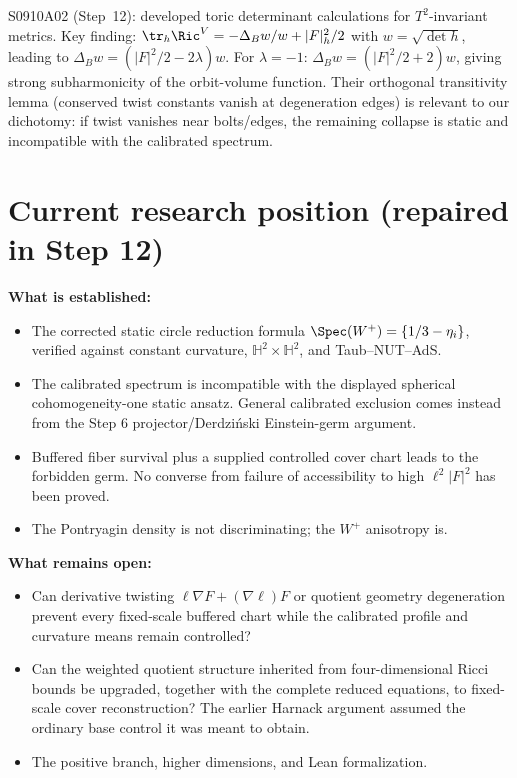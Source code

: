 S0910A02 (Step~12): developed toric determinant calculations for $T^2$-invariant
metrics.  Key finding: $\tr_h\Ric^V=-\Delta_Bw/w+|F|_h^2/2$ with
$w=\sqrt{\det h}$, leading to $\Delta_Bw=(|F|^2/2-2\lambda)w$.
For $\lambda=-1$: $\Delta_Bw=(|F|^2/2+2)w$, giving strong subharmonicity
of the orbit-volume function.  Their orthogonal transitivity lemma
(conserved twist constants vanish at degeneration edges) is relevant to
our dichotomy: if twist vanishes near bolts/edges, the remaining collapse
is static and incompatible with the calibrated spectrum.

\section{Current research position (repaired in Step 12)}

\textbf{What is established:}
\begin{itemize}
\item The corrected static circle reduction formula
$\Spec(W^+)=\{1/3-\eta_i\}$, verified against constant curvature,
$\mathbb H^2\times\mathbb H^2$, and Taub--NUT--AdS.
\item The calibrated spectrum is incompatible with the displayed spherical
cohomogeneity-one static ansatz.  General calibrated exclusion comes instead
from the Step 6 projector/Derdzi\'nski Einstein-germ argument.
\item Buffered fiber survival plus a supplied controlled cover chart leads to
the forbidden germ.  No converse from failure of accessibility to high
$\ell^2|F|^2$ has been proved.
\item The Pontryagin density is not discriminating; the $W^+$ anisotropy is.
\end{itemize}

\textbf{What remains open:}
\begin{itemize}
\item Can derivative twisting $\ell\nabla F+(\nabla\ell)F$ or quotient
geometry degeneration prevent every fixed-scale buffered chart while the
calibrated profile and curvature means remain controlled?
\item Can the weighted quotient structure inherited from four-dimensional
Ricci bounds be upgraded, together with the complete reduced equations, to
fixed-scale cover reconstruction?  The earlier Harnack argument assumed the
ordinary base control it was meant to obtain.
\item The positive branch, higher dimensions, and Lean formalization.
\end{itemize}

